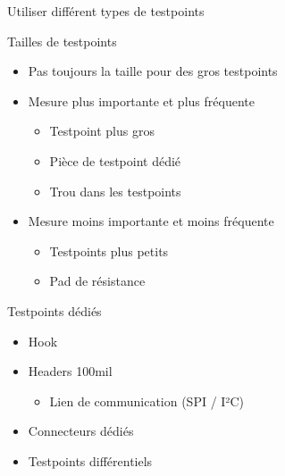 \begin{frame}{Utiliser différent types de testpoints}
\end{frame}

\begin{frame}{Tailles de testpoints}
    \begin{twocolumns}
        \leftcol
        \begin{itemize}
            \item Pas toujours la taille pour des gros testpoints
            \bigskip
            \item Mesure plus importante et plus fréquente
            \begin{itemize}
                \item Testpoint plus gros
                \item Pièce de testpoint dédié
                \item Trou dans les testpoints
            \end{itemize}
            \item Mesure moins importante et moins fréquente
            \begin{itemize}
                \item Testpoints plus petits
                \item Pad de résistance
            \end{itemize}
        \end{itemize}
        \rightcol

    \end{twocolumns}
\end{frame}

\begin{frame}{Testpoints dédiés}
    \begin{twocolumns}
        \leftcol
        \begin{itemize}
            \item<1-> Hook
            \item<2-> Headers 100mil
            \begin{itemize}
                \item<2-> Lien de communication (SPI / I²C)
            \end{itemize}
            \item<3-> Connecteurs dédiés
            \item<4-> Testpoints différentiels
        \end{itemize}
        \rightcol
    \end{twocolumns}
\end{frame}

